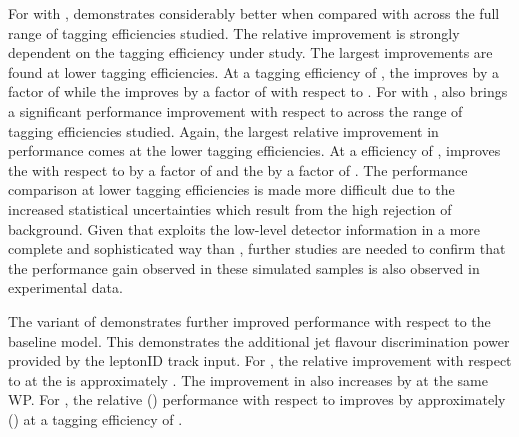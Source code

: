 For \ttbarjets with \ttbarpt, \GNN demonstrates considerably better \clrej when compared with \DLr across the full range of \bjet tagging efficiencies studied.
The relative improvement is strongly dependent on the \bjet tagging efficiency under study.
The largest improvements are found at lower \bjet tagging efficiencies.
At a \bjet tagging efficiency of \pct{\ttlo}, the \crej improves by a factor of \ttbclo while the \lrej improves by a factor of \ttbllo with respect to \DLr.
For \highpt \Zprimejets with \Zprimept, \GNN also brings a significant performance improvement with respect to \DLr across the range of \bjet tagging efficiencies studied.
Again, the largest relative improvement in performance comes at the lower \bjet tagging efficiencies.
At a \bjet efficiency of \pct{\zplo}, \GNN improves the \crej with respect to \DLr by a factor of \zpbclo and the \lrej by a factor of \zpbllo.
The performance comparison at lower \bjet tagging efficiencies is made more difficult due to the increased statistical uncertainties which result from the high rejection of background.
Given that \GNN exploits the low-level detector information in a more complete and sophisticated way than \DLr, further studies are needed to confirm that the performance gain observed in these simulated samples is also observed in experimental data.

The \GNNLep variant of \GNN demonstrates further improved performance with respect to the baseline model.
This demonstrates the additional jet flavour discrimination power provided by the leptonID track input.
For \ttbarjets, the relative \crej improvement with respect to \GNN at the \bWP{\ttlo} is approximately .
The improvement in \lrej also increases by  at the same WP.
For \Zprimejets, the relative \crej (\lrej) performance with respect to \GNN improves by approximately  () at a \bjet tagging efficiency of \pct{\zplo}.

